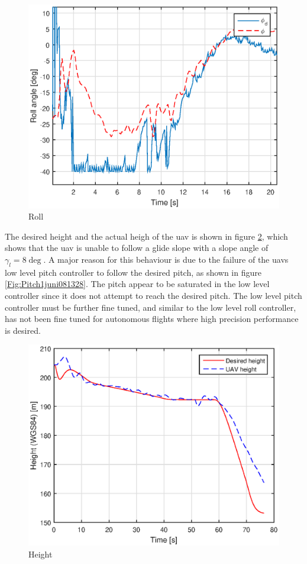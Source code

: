 \begin{figure}[H]
\centering
\includegraphics[scale=0.7]{figs/Experiment/Roll1juni081328.eps}
\caption{Roll}
\label{Fig:Roll1juni081328}
\end{figure}
The desired height and the actual heigh of the \gls{uav} is shown in figure \ref{Fig:Height1juni081328}, which shows that the \gls{uav} is unable to follow a glide slope with a slope angle of $\gamma_l = 8 \deg$. A major reason for this behaviour is due to the failure of the \gls{uav}s low level pitch controller to follow the desired pitch, as shown in figure \ref{Fig:Pitch1juni081328}. The pitch appear to be saturated in the low level controller since it does not attempt to reach the desired pitch. The low level pitch controller must be further fine tuned, and similar to the low level roll controller, has not been fine tuned for autonomous flights where high precision performance is desired.
\begin{figure}[H]
\centering
\includegraphics[scale=0.7]{figs/Experiment/Height1juni081328.eps}
\caption{Height}
\label{Fig:Height1juni081328}
\end{figure}
